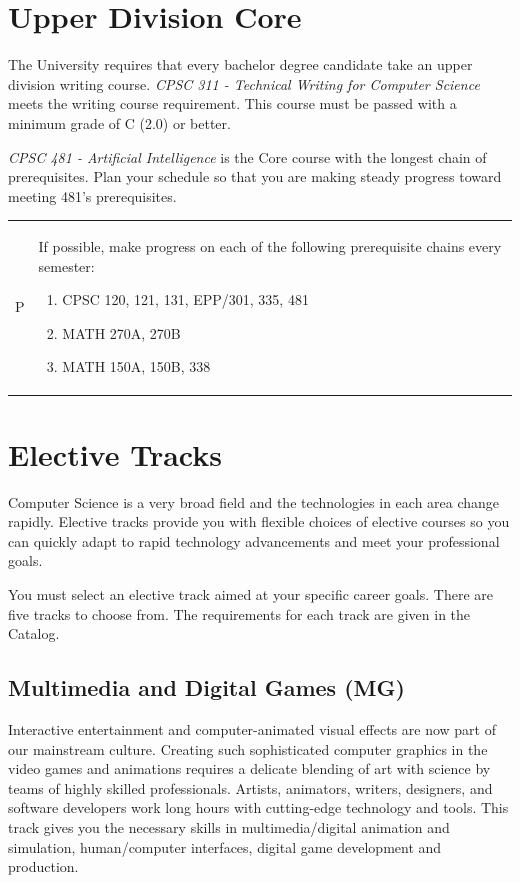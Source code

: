 \documentclass{book}
\newenvironment{tip}{
  \tcolorbox \begin{tabular}{m{.5in} m{5in}} \Large{P} &
}{
  \end{tabular} \endtcolorbox
}
\newcommand{\MgTrackName}{Multimedia and Digital Games (MG)}
\begin{document}
\section{Upper Division Core}

The University requires that every bachelor degree candidate take an upper division writing course. \emph{CPSC 311 - Technical Writing for Computer Science} meets the writing course requirement. This course must be passed with a minimum grade of C (2.0) or better.

\emph{CPSC 481 - Artificial Intelligence} is the Core course with the longest chain of prerequisites. Plan your schedule so that you are making steady progress toward meeting 481's prerequisites.

\begin{tip}
  If possible, make progress on each of the following prerequisite chains every semester:
  \begin{enumerate}
  \item CPSC 120, 121, 131, EPP/301, 335, 481
  \item MATH 270A, 270B
  \item MATH 150A, 150B, 338
  \end{enumerate}
\end{tip}

\section{Elective Tracks}
 
Computer Science is a very broad field and the technologies in each area change rapidly. Elective tracks provide you with flexible choices of elective courses so you can quickly adapt to rapid technology advancements and meet your professional goals.

You must select an elective track aimed at your specific career goals. There are five tracks to choose from. The requirements for each track are given in the Catalog.

\subsection{\MgTrackName}
\MgTrackIndex
Interactive entertainment and computer-animated visual effects are now part of our mainstream culture. Creating such sophisticated computer graphics in the video games and animations requires a delicate blending of art with science by teams of highly skilled professionals. Artists, animators, writers, designers, and software developers work long hours with cutting-edge technology and tools. This track gives you the necessary skills in multimedia/digital animation and simulation, human/computer interfaces, digital game development and production.
\end{document}
